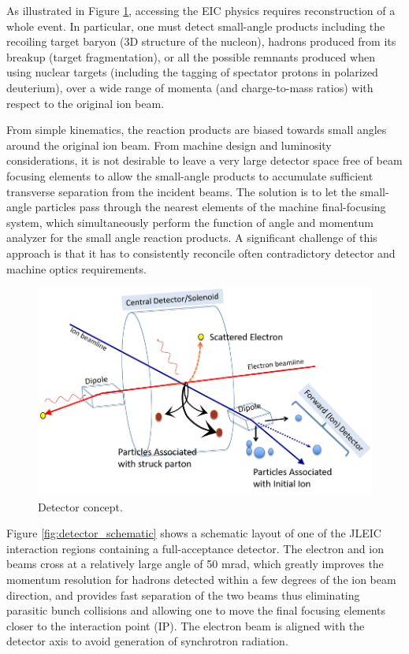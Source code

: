 As illustrated in Figure \ref{fig:detector_concept}, accessing the EIC physics requires reconstruction of a whole event. In particular, one must detect small-angle products including the recoiling target baryon (3D structure of the nucleon), hadrons produced from its breakup (target fragmentation), or all the possible remnants produced when using nuclear targets (including the tagging of spectator protons in polarized deuterium), over a wide range of momenta (and charge-to-mass ratios) with respect to the original ion beam.

From simple kinematics, the reaction products are biased towards small angles around the original ion beam. From machine design and luminosity considerations, it is not desirable to leave a very large detector space free of beam focusing elements to allow the small-angle products to accumulate sufficient transverse separation from the incident beams. The solution is to let the small-angle particles pass through the nearest elements of the machine final-focusing system, which simultaneously perform the function of angle and momentum analyzer for the small angle reaction products. A significant challenge of this approach is that it has to consistently reconcile often contradictory detector and machine optics requirements.

\begin{figure}[!htb]
	\centering
	\includegraphics[width=.75\textwidth]{../../img/central_detector.png}
	\caption{Detector concept.}
	\label{fig:detector_concept}
\end{figure}

Figure \ref{fig:detector_schematic} shows a schematic layout of one of the JLEIC interaction regions containing a full-acceptance detector\cite{Abeyratne:2012ah}\cite{Abeyratne:2015pma}\cite{Lin:2013}\cite{Morozov:2012}\cite{Morozov:2014}.  The electron and ion beams cross at a relatively large angle of 50 mrad, which greatly improves the momentum resolution for hadrons detected within a few degrees of the ion beam direction, and provides fast separation of the two beams thus eliminating parasitic bunch collisions and allowing one to move the final focusing elements closer to the interaction point (IP). The electron beam is aligned with the detector axis to avoid generation of synchrotron radiation.


